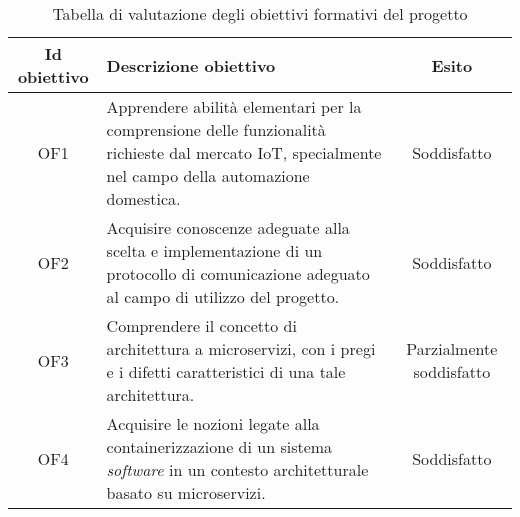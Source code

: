 \begin{table}[H]
\caption{Tabella di valutazione degli obiettivi formativi del progetto}
\label{tab:esito-obiettivi-formativi}
\begin{tabularx}{\linewidth}{|c|X|c|}
\hline
\textbf{Id obiettivo} & \textbf{Descrizione obiettivo} & \textbf{Esito}\\
\hline
OF1 & Apprendere abilità elementari per la comprensione delle funzionalità richieste dal mercato IoT, specialmente nel campo della automazione domestica. & Soddisfatto \\
\hline
OF2 & Acquisire conoscenze adeguate alla scelta e implementazione di un protocollo di comunicazione adeguato al campo di utilizzo del progetto. & Soddisfatto \\
\hline
OF3 & Comprendere il concetto di architettura a microservizi, con i pregi e i difetti caratteristici di una tale architettura. & Parzialmente soddisfatto \\
\hline
OF4 & Acquisire le nozioni legate alla containerizzazione di un sistema \emph{software} in un contesto architetturale basato su microservizi. & Soddisfatto \\
\hline
\end{tabularx}
\end{table}

